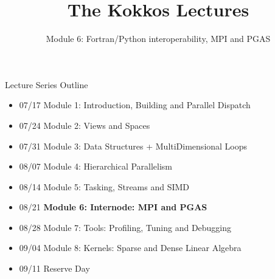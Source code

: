 
\def\sandid{SAND2020-8766 PE}
\usepackage{pgfplotstable}

\title{The Kokkos Lectures}

\author{Module 6: Fortran/Python interoperability, MPI and PGAS}




\shortfalse
\mediumtrue
\fulltrue
\notoverviewtrue



% 

\begin{frame}
	\titlepage
\end{frame}



\begin{frame}{Lecture Series Outline}

\begin{itemize}
        \item 07/17 Module 1: Introduction, Building and Parallel Dispatch
        \item 07/24 Module 2: Views and Spaces
        \item 07/31 Module 3: Data Structures + MultiDimensional Loops
        \item 08/07 Module 4: Hierarchical Parallelism
        \item 08/14 Module 5: Tasking, Streams and SIMD
        \item 08/21 \textbf{Module 6: Internode: MPI and PGAS}
        \item 08/28 Module 7: Tools: Profiling, Tuning and Debugging
        \item 09/04 Module 8: Kernels: Sparse and Dense Linear Algebra
        \item 09/11 Reserve Day
\end{itemize}
\end{frame}

